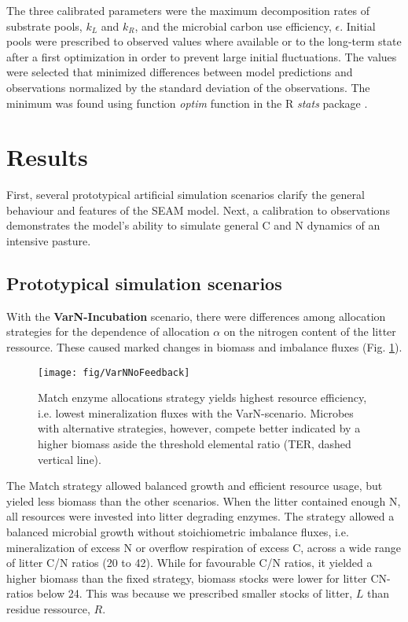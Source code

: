 The three calibrated parameters were the maximum decomposition rates of
substrate pools, $k_L$ and $k_R$, and the microbial carbon use efficiency,
$\epsilon$. Initial pools were prescribed to observed values where available or
to the long-term state after a first optimization in order to prevent large
initial fluctuations. The values were selected that minimized differences
between model predictions and observations normalized by the standard deviation
of the observations. The minimum was found using function \textit{optim}
function in the R \textit{stats} package \citep{R07}.
 
\section{Results}

First, several prototypical artificial simulation scenarios clarify the
general behaviour and features of the SEAM model. Next, a calibration to
observations demonstrates the model's ability to simulate general C and N
dynamics of an intensive pasture.

\subsection{Prototypical simulation scenarios}

With the \textbf{VarN-Incubation} scenario, there were differences among
allocation strategies for the dependence of allocation $\alpha$ on the nitrogen
content of the litter ressource. These caused marked changes in
biomass and imbalance fluxes (Fig.
\ref{fig:VarNNoFeedback}).

\begin{figure}[t]
\vspace*{2mm}
\begin{center}
\texttt{[image: fig/VarNNoFeedback]}
\end{center}
\caption{Match enzyme allocations strategy yields highest resource
efficiency, i.e. lowest mineralization fluxes with the VarN-scenario. Microbes
with alternative strategies, however, compete better indicated by a higher biomass aside
the threshold elemental ratio (TER, dashed vertical line).
\label{fig:VarNNoFeedback}}
\end{figure}

The Match strategy allowed balanced growth and efficient resource usage, but
yieled less biomass than the other scenarios. When the litter contained enough
N, all resources were invested into litter degrading enzymes. The strategy
allowed a balanced microbial growth without stoichiometric imbalance fluxes,
i.e. mineralization of excess N or overflow respiration of excess C, across a
wide range of litter C/N ratios (20 to 42). While for favourable C/N ratios, it
yielded a higher biomass than the fixed strategy, biomass stocks were lower for
litter CN-ratios below 24. This was because we prescribed smaller stocks of
litter, $L$ than residue ressource, $R$. 

